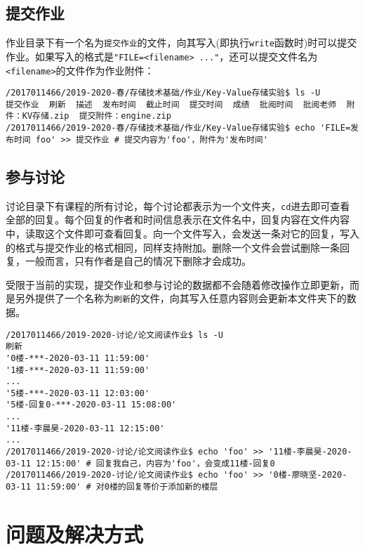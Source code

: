 \documentclass[12pt, UTF8]{article}
\begin{document}
\subsection{提交作业}

作业目录下有一个名为\lstinline|提交作业|的文件，向其写入(即执行\lstinline|write|函数时)时可以提交作业。如果写入的格式是\lstinline|"FILE=<filename> ..."|，还可以提交文件名为\lstinline|<filename>|的文件作为作业附件：

\begin{lstlisting}[language = {}]
/2017011466/2019-2020-春/存储技术基础/作业/Key-Value存储实验$ ls -U
提交作业  刷新  描述  发布时间  截止时间  提交时间  成绩  批阅时间  批阅老师  附件：KV存储.zip  提交附件：engine.zip
/2017011466/2019-2020-春/存储技术基础/作业/Key-Value存储实验$ echo 'FILE=发布时间 foo' >> 提交作业 # 提交内容为'foo'，附件为'发布时间'
\end{lstlisting}

\subsection{参与讨论}

讨论目录下有课程的所有讨论，每个讨论都表示为一个文件夹，\lstinline|cd|进去即可查看全部的回复。每个回复的作者和时间信息表示在文件名中，回复内容在文件内容中，读取这个文件即可查看回复。向一个文件写入，会发送一条对它的回复，写入的格式与提交作业的格式相同，同样支持附加。删除一个文件会尝试删除一条回复，一般而言，只有作者是自己的情况下删除才会成功。

受限于当前的实现，提交作业和参与讨论的数据都不会随着修改操作立即更新，而是另外提供了一个名称为\lstinline|刷新|的文件，向其写入任意内容则会更新本文件夹下的数据。

\begin{lstlisting}[language = {}]
/2017011466/2019-2020-讨论/论文阅读作业$ ls -U
刷新
'0楼-***-2020-03-11 11:59:00'
'1楼-***-2020-03-11 11:59:00'
...
'5楼-***-2020-03-11 12:03:00'
'5楼-回复0-***-2020-03-11 15:08:00'
...
'11楼-李晨昊-2020-03-11 12:15:00'
...
/2017011466/2019-2020-讨论/论文阅读作业$ echo 'foo' >> '11楼-李晨昊-2020-03-11 12:15:00' # 回复我自己，内容为'foo'，会变成11楼-回复0
/2017011466/2019-2020-讨论/论文阅读作业$ echo 'foo' >> '0楼-廖晓坚-2020-03-11 11:59:00' # 对0楼的回复等价于添加新的楼层
\end{lstlisting}

\section{问题及解决方式}
\end{document}
